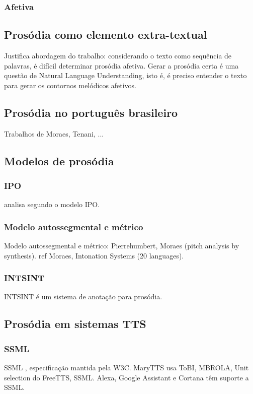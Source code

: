 \subsubsection{Afetiva}
\subsection{Prosódia como elemento extra-textual}
Justifica abordagem do trabalho: considerando o texto como sequência de
palavras, é difícil determinar prosódia afetiva. Gerar a prosódia certa é uma
questão de Natural Language Understanding, isto é, é preciso entender o texto
para gerar os contornos melódicos afetivos.
\subsection{Prosódia no português brasileiro}
Trabalhos de Moraes, Tenani, ...
\subsection{Modelos de prosódia}
\subsubsection{IPO}
\cite{ipo} analisa segundo o modelo IPO.
\subsubsection{Modelo autossegmental e métrico}
Modelo autossegmental e métrico: Pierrehumbert, Moraes (pitch analysis by synthesis).
ref Moraes, Intonation Systems (20 languages).
\subsubsection{INTSINT}
INTSINT é um sistema de anotação para prosódia.
\subsection{Prosódia em sistemas TTS}
\subsubsection{SSML}
SSML \cite{SSML}, especificação mantida pela W3C.
MaryTTS usa ToBI, MBROLA, Unit selection do FreeTTS, SSML.
Alexa, Google Assistant e Cortana têm suporte a SSML.

